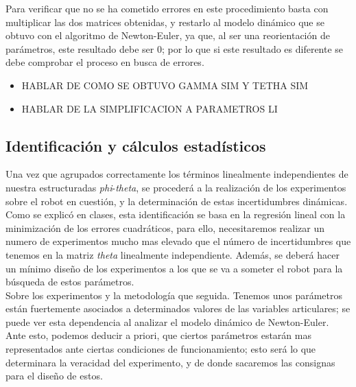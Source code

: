 \begin{itemize}
Para verificar que no se ha cometido errores en este procedimiento basta con multiplicar las dos matrices obtenidas, y restarlo al modelo dinámico
que se obtuvo con el algoritmo de Newton-Euler, ya que, al ser una reorientación de parámetros, este resultado debe ser 0; por lo que
si este resultado es diferente se debe comprobar el proceso en busca de errores.
\end{itemize}

	\begin{itemize}

		\item HABLAR DE COMO SE OBTUVO GAMMA SIM Y TETHA SIM
		\item HABLAR DE LA SIMPLIFICACION A PARAMETROS LI



	\end{itemize}

	\newpage

	\subsection{Identificación y cálculos estadísticos}

	Una vez que agrupados correctamente los términos linealmente independientes de nuestra estructuradas
	\textit{phi}-\textit{theta}, se procederá a la realización de los experimentos sobre
	el robot en cuestión, y la determinación de estas incertidumbres dinámicas.\\

	Como se explicó en clases, esta identificación se basa en la regresión lineal con la minimización de los
	errores cuadráticos, para ello, necesitaremos realizar un numero de experimentos mucho mas elevado que el número
	de incertidumbres que tenemos en la matriz \textit{theta} linealmente independiente. Además, se deberá hacer
	un mínimo diseño de los experimentos a los que se va a someter el robot para la búsqueda de estos parámetros.\\

	Sobre los experimentos y la metodología que seguida. Tenemos unos parámetros están fuertemente asociados a determinados
	valores de las variables articulares; se puede ver esta dependencia al analizar el modelo dinámico de Newton-Euler.
	 Ante esto, podemos deducir a priori, que ciertos parámetros estarán mas representados ante ciertas condiciones de funcionamiento; esto será lo que determinara la
	veracidad del experimento, y de donde sacaremos las consignas para el diseño de estos.\\

